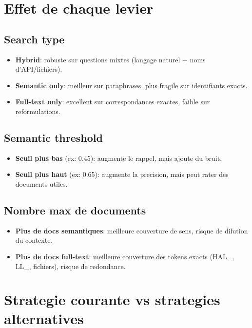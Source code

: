 \documentclass[11pt,a4paper]{article}
\begin{document}
\section{Effet de chaque levier}

\subsection{Search type}
\begin{itemize}
  \item \textbf{Hybrid}: robuste sur questions mixtes (langage naturel + noms d'API/fichiers).
  \item \textbf{Semantic only}: meilleur sur paraphrases, plus fragile sur identifiants exacts.
  \item \textbf{Full-text only}: excellent sur correspondances exactes, faible sur reformulations.
\end{itemize}

\subsection{Semantic threshold}
\begin{itemize}
  \item \textbf{Seuil plus bas} (ex: 0.45): augmente le rappel, mais ajoute du bruit.
  \item \textbf{Seuil plus haut} (ex: 0.65): augmente la precision, mais peut rater des documents utiles.
\end{itemize}

\subsection{Nombre max de documents}
\begin{itemize}
  \item \textbf{Plus de docs semantiques}: meilleure couverture de sens, risque de dilution du contexte.
  \item \textbf{Plus de docs full-text}: meilleure couverture des tokens exacts (HAL\_, LL\_, fichiers), risque de redondance.
\end{itemize}

\section{Strategie courante vs strategies alternatives}
\end{document}
